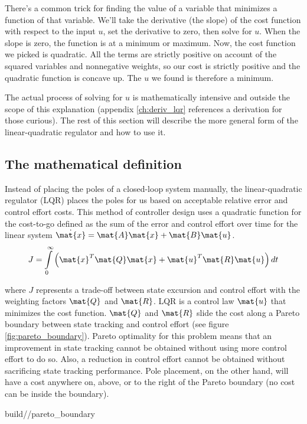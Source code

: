 There's a common trick for finding the value of a variable that minimizes a
function of that variable. We'll take the derivative (the slope) of the cost
function with respect to the input $u$, set the derivative to zero, then solve
for $u$. When the slope is zero, the function is at a minimum or maximum. Now,
the cost function we picked is quadratic. All the terms are strictly positive on
account of the squared variables and nonnegative weights, so our cost is
strictly positive and the quadratic function is concave up. The $u$ we found is
therefore a minimum.

The actual process of solving for $u$ is mathematically intensive and outside
the scope of this explanation (appendix \ref{ch:deriv_lqr} references a
derivation for those curious). The rest of this section will describe the more
general form of the linear-quadratic regulator and how to use it.

\subsection{The mathematical definition}

Instead of placing the poles of a closed-loop \gls{system} manually, the
linear-quadratic regulator (LQR) places the poles for us based on acceptable
relative \gls{error} and \gls{control effort} costs. This method of controller
design uses a quadratic function for the cost-to-go defined as the sum of the
\gls{error} and \gls{control effort} over time for the linear \gls{system}
$\dot{\mat{x}} = \mat{A}\mat{x} + \mat{B}\mat{u}$.
\begin{equation*}
  J = \int\limits_0^\infty \left(\mat{x}^T\mat{Q}\mat{x} +
    \mat{u}^T\mat{R}\mat{u}\right) dt
\end{equation*}

where $J$ represents a trade-off between \gls{state} excursion and
\gls{control effort} with the weighting factors $\mat{Q}$ and $\mat{R}$. LQR is
a \gls{control law} $\mat{u}$ that minimizes the cost function. $\mat{Q}$ and
$\mat{R}$ slide the cost along a Pareto boundary between state tracking and
\gls{control effort} (see figure \ref{fig:pareto_boundary}). Pareto optimality
for this problem means that an improvement in state \gls{tracking} cannot be
obtained without using more \gls{control effort} to do so. Also, a reduction in
\gls{control effort} cannot be obtained without sacrificing state \gls{tracking}
performance. Pole placement, on the other hand, will have a cost anywhere on,
above, or to the right of the Pareto boundary (no cost can be inside the
boundary).
\begin{svg}{build/\chapterpath/pareto_boundary}
  \caption{Pareto boundary for LQR}
  \label{fig:pareto_boundary}
\end{svg}

